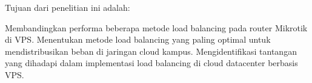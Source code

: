 Tujuan dari penelitian ini adalah:

    Membandingkan performa beberapa metode load balancing pada router Mikrotik di VPS.
    Menentukan metode load balancing yang paling optimal untuk mendistribusikan beban di jaringan cloud kampus.
    Mengidentifikasi tantangan yang dihadapi dalam implementasi load balancing di cloud datacenter berbasis VPS.
